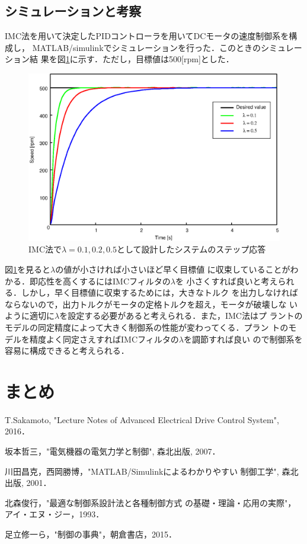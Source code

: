 \documentclass[a4paper,12pt]{jarticle}
\begin{document}
\subsection{シミュレーションと考察}
IMC法を用いて決定したPIDコントローラを用いてDCモータの速度制御系を構成し，
MATLAB/simulinkでシミュレーションを行った．このときのシミュレーション結
果を図\ref{fig:IMC_result}に示す．ただし，目標値は500[rpm]とした．
%
\begin{figure}[tbp]
 \begin{center}
  \includegraphics[width = 150mm]{fig/IMC_result.eps}
 \end{center}
 \caption{IMC法で$\lambda=0.1,0.2,0.5$として設計したシステムのステップ応答}
 \label{fig:IMC_result}
\end{figure}
%
図\ref{fig:IMC_result}を見ると$\lambda$の値が小さければ小さいほど早く目標値
に収束していることがわかる．即応性を高くするにはIMCフィルタの$\lambda$を
小さくすれば良いと考えられる．しかし，早く目標値に収束するためには，大きなトルク
を出力しなければならないので，出力トルクがモータの定格トルクを超え，モータが破壊しな
いように適切に$\lambda$を設定する必要があると考えられる．また，IMC法はプ
ラントのモデルの同定精度によって大きく制御系の性能が変わってくる．プラン
トのモデルを精度よく同定さえすればIMCフィルタの$\lambda$を調節すれば良い
ので制御系を容易に構成できると考えられる．
%
\section{まとめ}

%
\begin{thebibliography}{99}

  T.Sakamoto,
		 "Lecture Notes of Advanced Electrical Drive Control System",
		 2016．

  坂本哲三，"電気機器の電気力学と制御", 森北出版, 2007．

  川田昌克，西岡勝博，"MATLAB/Simulinkによるわかりやすい
		 制御工学", 森北出版, 2001．

  北森俊行，"最適な制御系設計法と各種制御方式
		 の基礎・理論・応用の実際"，アイ・エヌ・ジー，1993．

 足立修一ら，"制御の事典"，朝倉書店，2015．
		 
\end{thebibliography}
\end{document}
